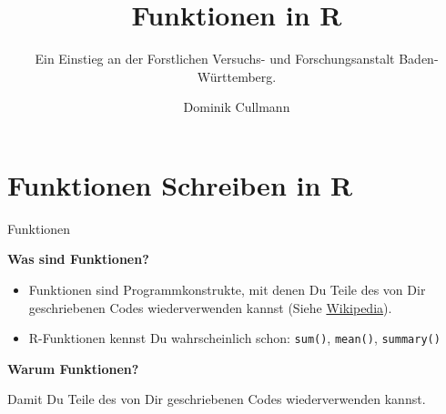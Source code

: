 \documentclass[compress]{beamer}
\title{Funktionen in \textbf{R}}
\subtitle{Ein Einstieg an der Forstlichen Versuchs- und Forschungsanstalt
Baden-Württemberg.}
\author{Dominik Cullmann}
\begin{document}
\frame{\titlepage}

\section{Funktionen Schreiben in R}\label{funktionen-schreiben-in-r}

\begin{frame}{Funktionen}

\textbf{Was sind Funktionen?}

\begin{itemize}
\itemsep1pt\parskip0pt
\item
  Funktionen sind Programmkonstrukte, mit denen Du Teile des von Dir
  geschriebenen Codes wiederverwenden kannst (Siehe
  \href{https://de.wikipedia.org/wiki/Funktion_(Programmierung)}{Wikipedia}).
\item
  R-Funktionen kennst Du wahrscheinlich schon: \texttt{sum()},
  \texttt{mean()}, \texttt{summary()}
\end{itemize}

\textbf{Warum Funktionen?}

Damit Du Teile des von Dir geschriebenen Codes wiederverwenden kannst.

\end{frame}
\end{document}
